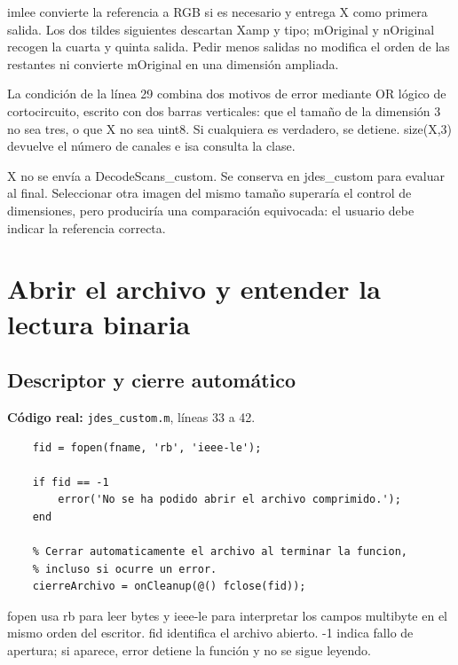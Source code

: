 \documentclass[11pt,a4paper,oneside]{report}
\begin{document}
imlee convierte la referencia a RGB si es necesario y entrega X como primera
salida. Los dos tildes siguientes descartan Xamp y tipo; mOriginal y nOriginal
recogen la cuarta y quinta salida. Pedir menos salidas no modifica el orden
de las restantes ni convierte mOriginal en una dimensión ampliada.

La condición de la línea 29 combina dos motivos de error mediante OR lógico
de cortocircuito, escrito con dos barras verticales: que el tamaño de la
dimensión 3 no sea tres, o que X no sea uint8. Si cualquiera es verdadero,
se detiene. size(X,3) devuelve el número de canales e isa consulta la clase.

X no se envía a DecodeScans\_custom. Se conserva en jdes\_custom para evaluar
al final. Seleccionar otra imagen del mismo tamaño superaría el control de
dimensiones, pero produciría una comparación equivocada: el usuario debe
indicar la referencia correcta.


\section{Abrir el archivo y entender la lectura binaria}

\par\medskip\noindent\begin{minipage}{\linewidth}

\subsection{Descriptor y cierre automático}

\textbf{Código real:} \texttt{jdes\_custom.m}, líneas 33 a 42.

\begin{lstlisting}[firstnumber=33]
    % PASO 3: abrir el archivo y leer la cabecera.
    fid = fopen(fname, 'rb', 'ieee-le');

    if fid == -1
        error('No se ha podido abrir el archivo comprimido.');
    end

    % Cerrar automaticamente el archivo al terminar la funcion,
    % incluso si ocurre un error.
    cierreArchivo = onCleanup(@() fclose(fid));
\end{lstlisting}

\end{minipage}\par


fopen usa rb para leer bytes y ieee-le para interpretar los campos multibyte
en el mismo orden del escritor. fid identifica el archivo abierto. -1 indica
fallo de apertura; si aparece, error detiene la función y no se sigue leyendo.
\end{document}
